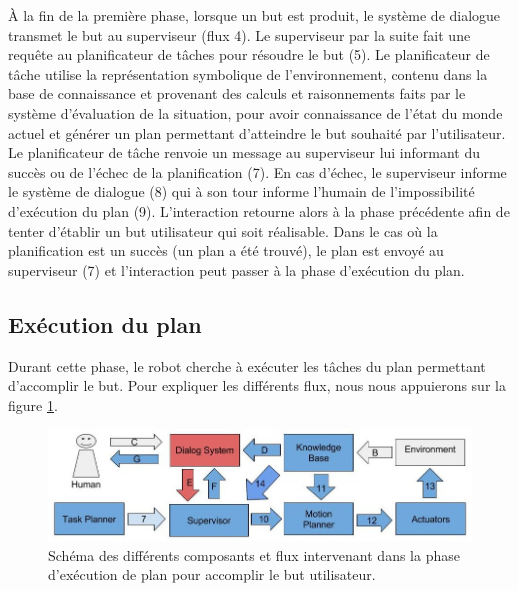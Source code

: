 \documentclass[a4paper,11pt,twoside]{StyleThese}
\begin{document}
À la fin de la première phase, lorsque un but est produit, le système de dialogue transmet le but au superviseur (flux 4). Le superviseur par la suite fait une requête au planificateur de tâches pour résoudre le but (5). Le planificateur de tâche utilise la représentation symbolique de l'environnement, contenu dans la base de connaissance et provenant des calculs et raisonnements faits par le système d'évaluation de la situation, pour avoir connaissance de l'état du monde actuel et générer un plan permettant d'atteindre le but souhaité par l'utilisateur. Le planificateur de tâche renvoie un message au superviseur lui informant du succès ou de l'échec de la planification (7). En cas d'échec, le superviseur informe le système de dialogue (8) qui à son tour informe l'humain de l'impossibilité d'exécution du plan (9).
L'interaction retourne alors à la phase précédente afin de tenter d'établir un but utilisateur qui soit réalisable. 
Dans le cas où la planification est un succès (un plan a été trouvé), le plan est envoyé au superviseur (7) et l'interaction peut passer à la phase d'exécution du plan.


\subsection{Exécution du plan}
\label{sec:phase3}
Durant cette phase, le robot cherche à exécuter les tâches du plan permettant d'accomplir le but. Pour expliquer les différents flux, nous nous appuierons sur la figure \ref{fig:phase3}.




\begin{figure}[ht!]
 \centering
  \includegraphics[width=0.99\linewidth]{./img/phase3color.jpg} 
  \caption {Schéma des différents composants et flux intervenant dans la phase d'exécution de plan pour accomplir le but utilisateur.}
  \label{fig:phase3}
\end{figure}
\end{document}
